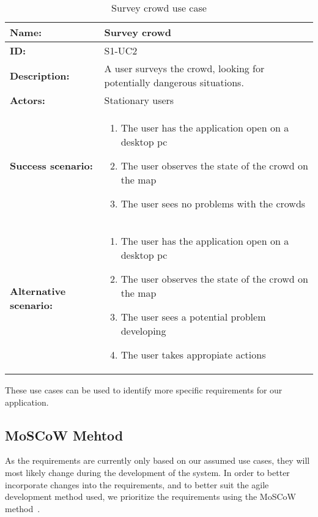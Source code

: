 \begin{table}[h!]
    \centering
    \begin{tabularx}{\textwidth}{|l|X|}
        \hline
        \textbf{Name:}  & Survey crowd \\ \hline
        \textbf{ID:}    & S1-UC2 \\ \hline
        \textbf{Description:} & A user surveys the crowd, looking for potentially dangerous situations. \\ \hline
        \textbf{Actors:} & Stationary users \\ \hline
        \textbf{Success scenario:} & 
        \begin{enumerate}
            \item The user has the application open on a desktop pc
            \item The user observes the state of the crowd on the map
            \item The user sees no problems with the crowds
        \end{enumerate}
        \\ \hline
        \textbf{Alternative scenario:} & 
        \begin{enumerate}
            \item The user has the application open on a desktop pc
            \item The user observes the state of the crowd on the map
            \item The user sees a potential problem developing
            \item The user takes appropiate actions
        \end{enumerate} 
        \\ \hline
    \end{tabularx}
    \caption{Survey crowd use case}
    \label{tab:s1-uc2}
\end{table}

These use cases can be used to identify more specific requirements for our application.

\subsection{MoSCoW Mehtod}
As the requirements are currently only based on our assumed use cases, they will most likely change during the development of the system. In order to better incorporate changes into the requirements, and to better suit the agile development method used, we prioritize the requirements using the MoSCoW method~\cite{moscow}.

